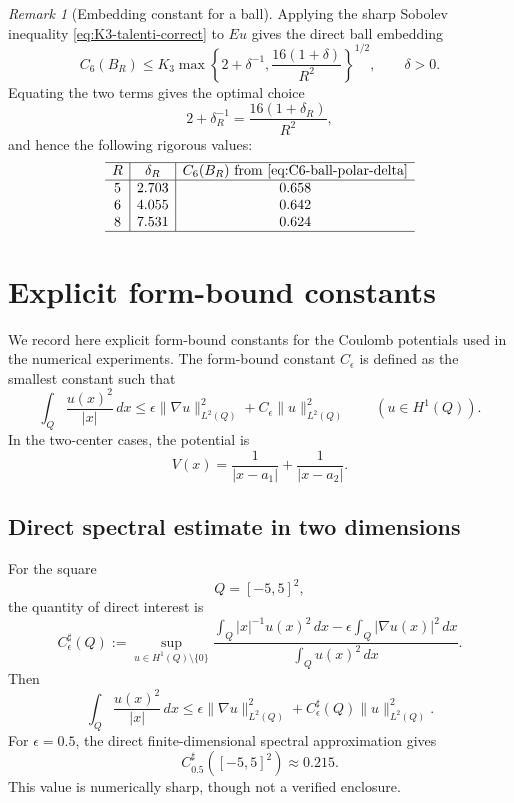 \documentclass[11pt]{article}
\theoremstyle{plain}
\theoremstyle{definition}
\theoremstyle{remark}
\newtheorem{remark}{Remark}
\begin{document}
\begin{remark}[Embedding constant for a ball]
Applying the sharp Sobolev inequality \eqref{eq:K3-talenti-correct} to $Eu$
gives the direct ball embedding
\begin{equation}
\label{eq:C6-ball-polar-delta}
  C_6(B_R)
  \le
  K_3
  \max\left\{
    2+\delta^{-1},\frac{16(1+\delta)}{R^2}
  \right\}^{1/2},
  \qquad \delta>0 .
\end{equation}
Equating the two terms gives the optimal choice
\[
  2+\delta_R^{-1}=\frac{16(1+\delta_R)}{R^2},
\]
and hence the following rigorous values:
\[
\begin{array}{c|c|c}
\hline
R & \delta_R & C_6(B_R)\text{ from }\eqref{eq:C6-ball-polar-delta}\\ \hline
5 & 2.703 & 0.658\\
6 & 4.055 & 0.642\\
8 & 7.531 & 0.624\\
\hline
\end{array}
\]

	
\end{remark}


\section{Explicit form-bound constants}
\label{app:ceps-analytic}

We record here explicit form-bound constants for the Coulomb potentials used in
the numerical experiments. The form-bound constant $C_\epsilon$ is defined as
the smallest constant such that
\[
\int_Q \frac{u(x)^2}{|x|}\,dx
\le
\epsilon \|\nabla u\|_{L^2(Q)}^2
+ C_\epsilon \|u\|_{L^2(Q)}^2
\qquad (u\in H^1(Q)).
\]
In the two-center cases, the potential is
\[
V(x)=\frac{1}{|x-a_1|}+\frac{1}{|x-a_2|}.
\]

\subsection{Direct spectral estimate in two dimensions}
\label{rmk:ceps-square-direct}

For the square
\[
Q=[-5,5]^2,
\]
the quantity of direct interest is
\[
C_\epsilon^\sharp(Q)
:=
\sup_{u\in H^1(Q)\setminus\{0\}}
\frac{\displaystyle \int_Q |x|^{-1}u(x)^2\,dx
-\epsilon\int_Q |\nabla u(x)|^2\,dx}
{\displaystyle \int_Q u(x)^2\,dx}.
\]
Then
\[
\int_Q \frac{u(x)^2}{|x|}\,dx
\le
\epsilon\|\nabla u\|_{L^2(Q)}^2
+
C_\epsilon^\sharp(Q)\|u\|_{L^2(Q)}^2.
\]
For $\epsilon=0.5$, the direct finite-dimensional spectral approximation gives
\[
C_{0.5}^\sharp([-5,5]^2)\approx 0.215.
\]
This value is numerically sharp, though not a verified enclosure.
\end{document}
